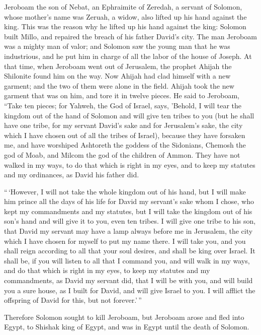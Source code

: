  Jeroboam the son of Nebat, an Ephraimite of Zeredah, a
servant of Solomon, whose mother's name was Zeruah, a widow, also lifted
up his hand against the king.  This was the reason why he
lifted up his hand against the king: Solomon built Millo, and repaired
the breach of his father David's city.  The man Jeroboam
was a mighty man of valor; and Solomon saw the young man that he was
industrious, and he put him in charge of all the labor of the house of
Joseph.  At that time, when Jeroboam went out of
Jerusalem, the prophet Ahijah the Shilonite found him on the way. Now
Ahijah had clad himself with a new garment; and the two of them were
alone in the field.  Ahijah took the new garment that was
on him, and tore it in twelve pieces.  He said to
Jeroboam, ``Take ten pieces; for Yahweh, the God of Israel, says,
'Behold, I will tear the kingdom out of the hand of Solomon and will
give ten tribes to you  (but he shall have one tribe, for
my servant David's sake and for Jerusalem's sake, the city which I have
chosen out of all the tribes of Israel),  because they
have forsaken me, and have worshiped Ashtoreth the goddess of the
Sidonians, Chemosh the god of Moab, and Milcom the god of the children
of Ammon. They have not walked in my ways, to do that which is right in
my eyes, and to keep my statutes and my ordinances, as David his father
did.

 ``\,`However, I will not take the whole kingdom out of
his hand, but I will make him prince all the days of his life for David
my servant's sake whom I chose, who kept my commandments and my
statutes,  but I will take the kingdom out of his son's
hand and will give it to you, even ten tribes.  I will
give one tribe to his son, that David my servant may have a lamp always
before me in Jerusalem, the city which I have chosen for myself to put
my name there.  I will take you, and you shall reign
according to all that your soul desires, and shall be king over Israel.
 It shall be, if you will listen to all that I command
you, and will walk in my ways, and do that which is right in my eyes, to
keep my statutes and my commandments, as David my servant did, that I
will be with you, and will build you a sure house, as I built for David,
and will give Israel to you.  I will afflict the
offspring of David for this, but not forever.'\,''

 Therefore Solomon sought to kill Jeroboam, but Jeroboam
arose and fled into Egypt, to Shishak king of Egypt, and was in Egypt
until the death of Solomon.

